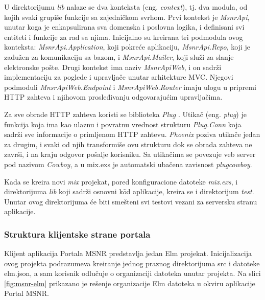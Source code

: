 \documentclass[12pt,oneside]{memoir}
\begin{document}
\par U direktorijumu \emph{lib} nalaze se dva konteksta (eng. \emph{context}), tj. dva modula, od kojih svaki grupiše funkcije sa zajedničkom svrhom. Prvi kontekst je \emph{MsnrApi}, unutar koga je enkapsulirana sva domenska i poslovna logika, i definisani svi entiteti i funkcije za rad sa njima. Inicijalno su kreirana tri podmodula ovog konteksta: \emph{MsnrApi.Application}, koji pokreće aplikaciju, \emph{MsnrApi.Repo}, koji je zadužen za komunikaciju sa bazom, i \emph{MsnrApi.Mailer}, koji služi za slanje elektronske pošte. Drugi kontekst ima naziv \emph{MsnrApiWeb}, i on sadrži implementaciju za poglede i upravljače unutar arhitekture MVC. Njegovi podmoduli \emph{MnsrApiWeb.Endpoint} i \emph{MsnrApiWeb.Router} imaju ulogu u pripremi HTTP zahteva i njihovom prosleđivanju odgovarajućim upravljačima. 
\par Za sve obrade HTTP zahteva koristi se biblioteka \emph{Plug} \cite{plug}. Utikač (eng. \emph{plug}) je funkcija koja ima kao ulaznu i povratnu vrednost strukturu \emph{Plug.Conn} koja sadrži sve informacije o primljenom HTTP zahtevu. \emph{Phoenix} poziva utikače jedan za drugim, i svaki od njih transformiše ovu strukturu dok se obrada zahteva ne završi, i na kraju odgovor pošalje korisniku. Sa utikačima se povezuje veb server pod nazivom \emph{Cowboy}, a u mix.exs je automatski ubačena zavisnost \emph{plug{\textunderscore}cowboy}.
\par Kada se kreira novi \emph{mix} projekat, pored konfiguracione datoteke \emph{mix.exs}, i direktorijuma \emph{lib} koji sadrži osnovni k$\hat{o}$d aplikacije, kreira se i direktorijum \emph{test}. Unutar ovog direktorijuma će biti smešteni svi testovi vezani za serversku stranu aplikacije. 

\subsubsection{Struktura klijentske strane portala}
\par Klijent aplikacija Portala MSNR predstavlja jedan Elm projekat. Inicijalizacija ovog projekta podrazumeva kreiranje jednog praznog direktorijuma src i datoteke elm.json, a sam korisnik odlučuje o organizaciji datoteka unutar projekta. Na slici \ref{fig:msnr-elm} prikazano je rešenje organizacije Elm datoteka u okviru aplikacije Portal MSNR. 
\end{document}
